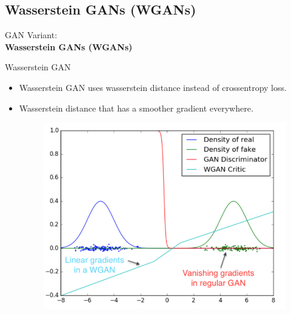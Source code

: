 \subsection{Wasserstein GANs (WGANs)}
\begin{frame}{}
    \LARGE GAN Variant: \\[1.5ex] \textbf{Wasserstein GANs (WGANs)}
\end{frame}

\begin{frame}[allowframebreaks]{Wasserstein GAN}
\begin{itemize}
    \item Wasserstein GAN uses wasserstein distance instead of crossentropy loss.
    \item Wasserstein distance that has a smoother gradient everywhere.
        \begin{figure}
            \centering
            \includegraphics[height=0.6\textheight, width=\textwidth, keepaspectratio]{images/gan/wgan_1.png}
        \end{figure}
\end{itemize}
    
\end{frame}

